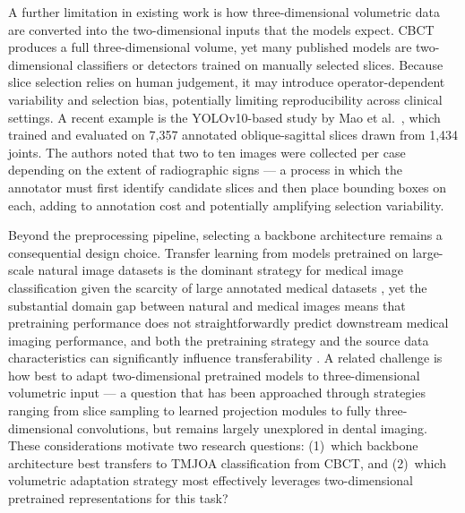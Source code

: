 \documentclass[review,12pt]{elsarticle}
\begin{document}
A further limitation in existing work is how three-dimensional volumetric data are converted into the two-dimensional inputs that the models expect. CBCT produces a full three-dimensional volume, yet many published models are two-dimensional classifiers or detectors trained on manually selected slices. Because slice selection relies on human judgement, it may introduce operator-dependent variability and selection bias, potentially limiting reproducibility across clinical settings. A recent example is the YOLOv10-based study by Mao et al.\ \cite{Mao2025}, which trained and evaluated on 7,357 annotated oblique-sagittal slices drawn from 1,434 joints. The authors noted that two to ten images were collected per case depending on the extent of radiographic signs — a process in which the annotator must first identify candidate slices and then place bounding boxes on each, adding to annotation cost and potentially amplifying selection variability.

Beyond the preprocessing pipeline, selecting a backbone architecture remains a consequential design choice. Transfer learning from models pretrained on large-scale natural image datasets is the dominant strategy for medical image classification given the scarcity of large annotated medical datasets \cite{kim2022transfer}, yet the substantial domain gap between natural and medical images means that pretraining performance does not straightforwardly predict downstream medical imaging performance, and both the pretraining strategy and the source data characteristics can significantly influence transferability \cite{hosseinzadeh2021systematic}. A related challenge is how best to adapt two-dimensional pretrained models to three-dimensional volumetric input — a question that has been approached through strategies ranging from slice sampling to learned projection modules to fully three-dimensional convolutions, but remains largely unexplored in dental imaging. These considerations motivate two research questions: (1)~which backbone architecture best transfers to TMJOA classification from CBCT, and (2)~which volumetric adaptation strategy most effectively leverages two-dimensional pretrained representations for this task?
\end{document}
